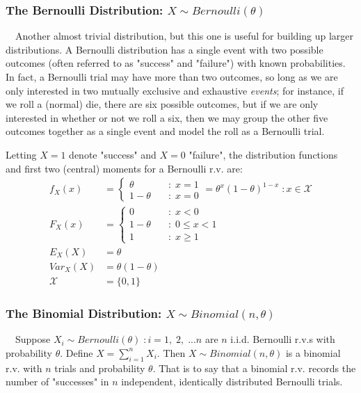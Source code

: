 \documentclass[12pt,a4paper]{article}
\begin{document}
\subsubsection{The Bernoulli Distribution: $X \sim Bernoulli(\theta)$}

$\quad$Another almost trivial distribution, but this one is useful for building up larger distributions. A Bernoulli distribution has a single event with two possible outcomes (often referred to as "success" and "failure") with known probabilities. In fact, a Bernoulli trial may have more than two outcomes, so long as we are only interested in two mutually exclusive and exhaustive \emph{events}; for instance, if we roll a (normal) die, there are six possible outcomes, but if we are only interested in whether or not we roll a six, then we may group the other five outcomes together as a single event and model the roll as a Bernoulli trial.

Letting $X=1$ denote "success" and $X=0$ "failure", the distribution functions and first two (central) moments for a Bernoulli r.v. are:
\begin{align*}
f_X(x) &= \left\{ \begin{array}{cl} \theta \quad & : \; x = 1\\ 1-\theta \quad & : \; x = 0 \end{array} \right. = \theta^x(1-\theta)^{1-x} \; : x \in \mathcal{X}\\
F_X(x) &= \left\{ \begin{array}{cl} 0 \quad & : \; x < 0\\ 1-\theta \quad & : \; 0 \leq x < 1\\ 1 \quad & : \; x \geq 1 \end{array} \right.\\
E_{X}(X) &= \theta\\
Var_{X}(X) &= \theta(1-\theta)\\
\mathcal{X} &= \{0,1\}
\end{align*}

\subsubsection{The Binomial Distribution: $X \sim Binomial(n,\theta)$}

$\quad$Suppose $X_i \sim Bernoulli(\theta) \; : i = 1,\; 2,\; ... n$ are $n$ i.i.d. Bernoulli r.v.s with probability $\theta$. Define $X = \sum_{i=1}^n X_i$. Then $X \sim Binomial(n, \theta)$ is a binomial r.v. with $n$ trials and probability $\theta$. That is to say that a binomial r.v. records the number of "successes" in $n$ independent, identically distributed Bernoulli trials.
\end{document}
